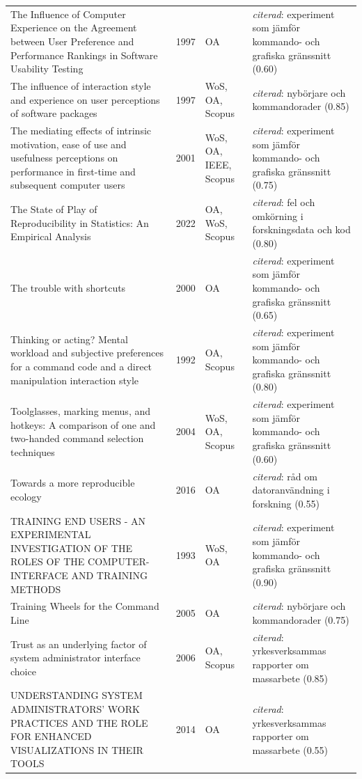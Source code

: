 \begin{longtable}{@{}%
  >{\raggedright\arraybackslash}p{}c%
  >{\raggedright\arraybackslash}p{}%
  >{\raggedright\arraybackslash}p{}@{}}
The Influence of Computer Experience on the Agreement between User Preference and Performance Rankings in Software Usability Testing & 1997 & OA & \emph{citerad}: experiment som jämför kommando- och grafiska gränssnitt (0.60) \\
The influence of interaction style and experience on user perceptions of software packages & 1997 & WoS, OA, Scopus & \emph{citerad}: nybörjare och kommandorader (0.85) \\
The mediating effects of intrinsic motivation, ease of use and usefulness perceptions on performance in first-time and subsequent computer users & 2001 & WoS, OA, IEEE, Scopus & \emph{citerad}: experiment som jämför kommando- och grafiska gränssnitt (0.75) \\
The State of Play of Reproducibility in Statistics: An Empirical Analysis & 2022 & OA, WoS, Scopus & \emph{citerad}: fel och omkörning i forskningsdata och kod (0.80) \\
The trouble with shortcuts & 2000 & OA & \emph{citerad}: experiment som jämför kommando- och grafiska gränssnitt (0.65) \\
Thinking or acting? Mental workload and subjective preferences for a command code and a direct manipulation interaction style & 1992 & OA, Scopus & \emph{citerad}: experiment som jämför kommando- och grafiska gränssnitt (0.80) \\
Toolglasses, marking menus, and hotkeys: A comparison of one and two-handed command selection techniques & 2004 & WoS, OA, Scopus & \emph{citerad}: experiment som jämför kommando- och grafiska gränssnitt (0.60) \\
Towards a more reproducible ecology & 2016 & OA & \emph{citerad}: råd om datoranvändning i forskning (0.55) \\
TRAINING END USERS - AN EXPERIMENTAL INVESTIGATION OF THE ROLES OF THE COMPUTER-INTERFACE AND TRAINING METHODS & 1993 & WoS, OA & \emph{citerad}: experiment som jämför kommando- och grafiska gränssnitt (0.90) \\
Training Wheels for the Command Line & 2005 & OA & \emph{citerad}: nybörjare och kommandorader (0.75) \\
Trust as an underlying factor of system administrator interface choice & 2006 & OA, Scopus & \emph{citerad}: yrkesverksammas rapporter om massarbete (0.85) \\
UNDERSTANDING SYSTEM ADMINISTRATORS' WORK PRACTICES AND THE ROLE FOR ENHANCED VISUALIZATIONS IN THEIR TOOLS & 2014 & OA & \emph{citerad}: yrkesverksammas rapporter om massarbete (0.55) \\

\end{longtable}
